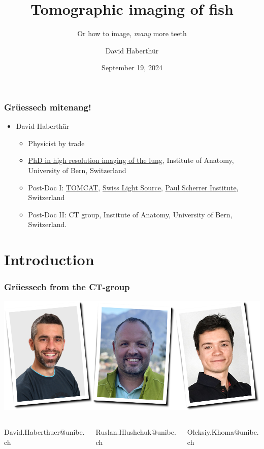 \documentclass[aspectratio=169,10pt]{beamer}
\title{Tomographic imaging of fish}
\subtitle{Or how to image, \emph{many} more teeth}
\author{David Haberthür}
\institute{Institute of Anatomy}
\date{September 19, 2024}
\newcommand{\imageheight}{0.618\paperheight}%
\newcommand{\uct}{{\textmu}CT\xspace}%
\begin{document}
\begin{frame}
	\maketitle
\end{frame}

\begin{frame}
	\frametitle{Grüessech mitenang!}
	\begin{itemize}
		\item David Haberthür
		\begin{itemize}
			\item Physicist by trade
			\item \href{https://boris.unibe.ch/2619/}{PhD in high resolution imaging of the lung}, Institute of Anatomy, University of Bern, Switzerland
			\item Post-Doc I: \href{https://www.psi.ch/sls/tomcat/}{TOMCAT}, \href{https://www.psi.ch/sls/}{Swiss Light Source}, \href{https://www.psi.ch/}{Paul Scherrer Institute}, Switzerland
			\item Post-Doc II: \uct{} group, Institute of Anatomy, University of Bern, Switzerland.
		\end{itemize}
	\end{itemize}
\end{frame}

\section{Introduction}
\begin{frame}
	\frametitle{Grüessech from the \uct-group}
	\centering
	\includegraphics[height=\imageheight]{./media/team}
		\begin{columns}
		\hfill\begin{column}{0.33\textwidth}
			\centering%
			David{\color{ubRed}.}Haberthuer{\color{ubRed}@unibe.ch}%
		\end{column}
		\begin{column}{0.33\textwidth}
			\centering%
			Ruslan{\color{ubRed}.}Hlushchuk{\color{ubRed}@unibe.ch}%
		\end{column}
		\begin{column}{0.33\textwidth}
			\centering%
			Oleksiy{\color{ubRed}.}Khoma{\color{ubRed}@unibe.ch}%
		\end{column}\hfill%
	\end{columns}
\end{frame}
\end{document}
